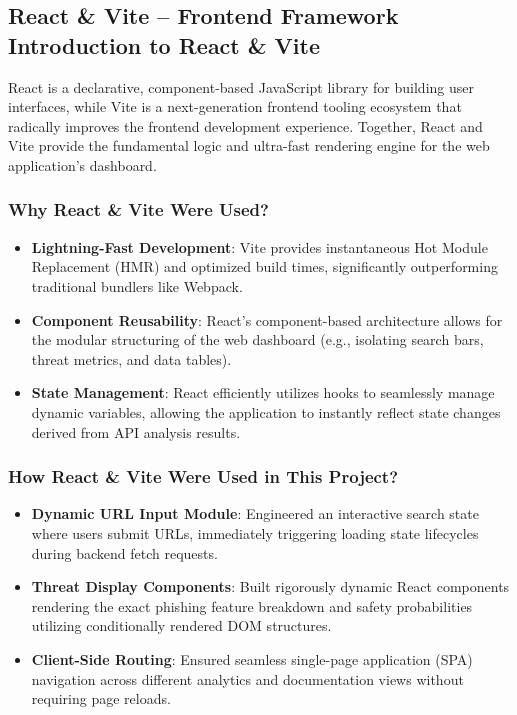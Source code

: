 \subsection{React \& Vite -- Frontend Framework Introduction to React \& Vite}
\noindent
React is a declarative, component-based JavaScript library for building user interfaces, while Vite is a next-generation frontend tooling ecosystem that radically improves the frontend development experience. Together, React and Vite provide the fundamental logic and ultra-fast rendering engine for the web application's dashboard.

\subsubsection*{Why React \& Vite Were Used?}

\begin{itemize}
\item \textbf{Lightning-Fast Development}: Vite provides instantaneous Hot Module Replacement (HMR) and optimized build times, significantly outperforming traditional bundlers like Webpack.
\item \textbf{Component Reusability}: React's component-based architecture allows for the modular structuring of the web dashboard (e.g., isolating search bars, threat metrics, and data tables).
\item \textbf{State Management}: React efficiently utilizes hooks to seamlessly manage dynamic variables, allowing the application to instantly reflect state changes derived from API analysis results.
\end{itemize}

\subsubsection*{How React \& Vite Were Used in This Project?}

\begin{itemize}
\item \textbf{Dynamic URL Input Module}: Engineered an interactive search state where users submit URLs, immediately triggering loading state lifecycles during backend fetch requests.
\item \textbf{Threat Display Components}: Built rigorously dynamic React components rendering the exact phishing feature breakdown and safety probabilities utilizing conditionally rendered DOM structures.
\item \textbf{Client-Side Routing}: Ensured seamless single-page application (SPA) navigation across different analytics and documentation views without requiring page reloads.
\end{itemize}

